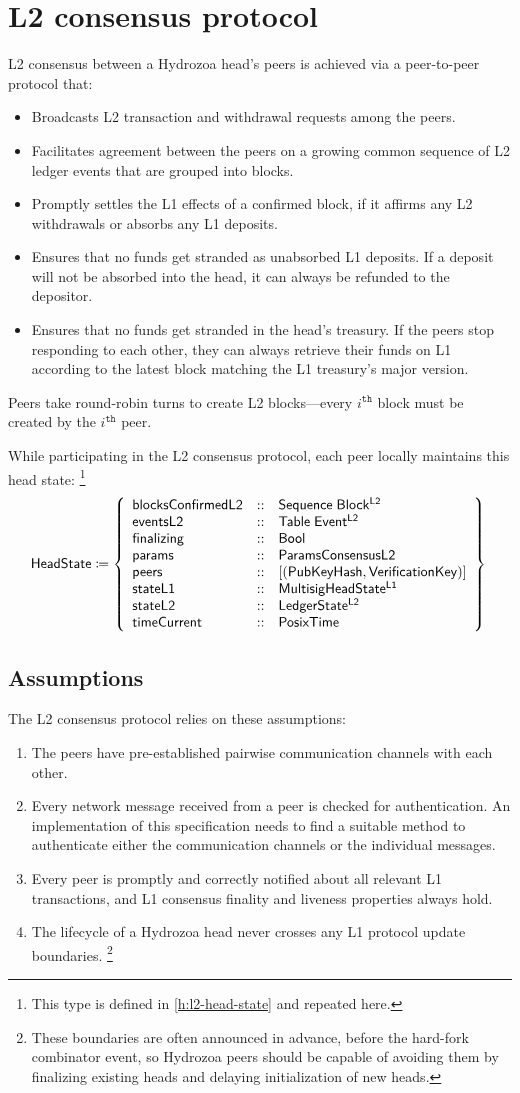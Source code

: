 \documentclass[../hydrozoa.tex]{subfiles}
\begin{document}
\chapter{L2 consensus protocol}%
\label{h:l2-consensus-protocol}%

L2 consensus between a Hydrozoa head's peers is achieved via a peer-to-peer protocol that:
\begin{itemize}
  \item Broadcasts L2 transaction and withdrawal requests among the peers.
  \item Facilitates agreement between the peers on a growing common sequence of L2 ledger events that are grouped into blocks.
  \item Promptly settles the L1 effects of a confirmed block, if it affirms any L2 withdrawals or absorbs any L1 deposits.
  \item Ensures that no funds get stranded as unabsorbed L1 deposits.
  If a deposit will not be absorbed into the head, it can always be refunded to the depositor.
  \item Ensures that no funds get stranded in the head's treasury.
  If the peers stop responding to each other, they can always retrieve their funds on L1 according to the latest block matching the L1 treasury's major version.
\end{itemize}

Peers take round-robin turns to create L2 blocks---every $i^\mathtt{th}$ block must be created by the  $i^\mathtt{th}$ peer.

While participating in the L2 consensus protocol, each peer locally maintains this head state:%
\footnote{This type is defined in \cref{h:l2-head-state} and repeated here.}
\begin{equation*}
  \headStateTypeName{} \coloneq \headStateTypeBody{}
\end{equation*}

\section{Assumptions}%
\label{h:l2-consensus-assumptions}%

The L2 consensus protocol relies on these assumptions:
\begin{enumerate}
  \item The peers have pre-established pairwise communication channels with each other.
  \item Every network message received from a peer is checked for authentication.
    An implementation of this specification needs to find a suitable method to authenticate either the communication channels or the individual messages.
  \item Every peer is promptly and correctly notified about all relevant L1 transactions, and L1 consensus finality and liveness properties always hold.
  \item The lifecycle of a Hydrozoa head never crosses any L1 protocol update boundaries.%
    \footnote{These boundaries are often announced in advance, before the hard-fork combinator event, so Hydrozoa peers should be capable of avoiding them by finalizing existing heads and delaying initialization of new heads.}
\end{enumerate}
\end{document}
